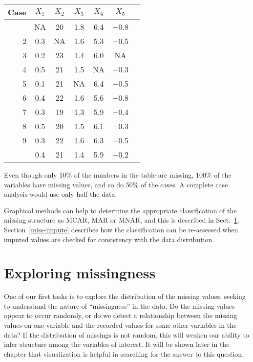 \begin{center}
\begin{tabular}{r@{\hspace{.5em}}|@{\hspace{.3em}}cccccc}
Case \T \B & $X_1$ & $X_2$ & $X_3$ & $X_4$ & $X_5$ \\
\hline
\T1& NA & 20 & 1.8 & 6.4 & $-$0.8 \\
2 & 0.3 & NA & 1.6 & 5.3 & $-$0.5 \\
3 & 0.2 & 23 & 1.4 & 6.0 & NA \\
4 & 0.5 & 21 & 1.5 & NA & $-$0.3 \\
5 & 0.1 & 21 & NA & 6.4 & $-$0.5 \\
6 & 0.4 & 22 & 1.6 & 5.6 & $-$0.8 \\
7 & 0.3 & 19 & 1.3 & 5.9 & $-$0.4 \\
8 & 0.5 & 20 & 1.5 & 6.1 & $-$0.3 \\
9 & 0.3 & 22 & 1.6 & 6.3 & $-$0.5 \\
\B10& 0.4 & 21 & 1.4 & 5.9 & $-$0.2 \\
\end{tabular}
\end{center}

\noindent Even though only 10\% of the numbers in the table are
missing, 100\% of the variables have missing values, and so do 50\% of
the cases.  A complete case analysis would use only half the data.

Graphical methods can help to determine the appropriate classification
of the missing structure as MCAR, MAR or MNAR, and this is described in
Sect.~\ref{miss-explore}.  Section~\ref{miss-impute} describes how
the classification can be re-assessed when imputed values are checked
for consistency with the data distribution.

\section{Exploring missingness}\label{miss-explore}

One of our first tasks is to explore the distribution of the missing
values, seeking to understand the nature of ``missingness'' in the
data.  Do the missing values appear to occur randomly, or do we detect
a relationship between the missing values on one variable and the
recorded values for some other variables in the data?  If the
distribution of missings is not random, this will weaken our ability
to infer structure among the variables of interest.  It will be shown
later in the chapter that visualization is helpful in searching for
the answer to this question.

